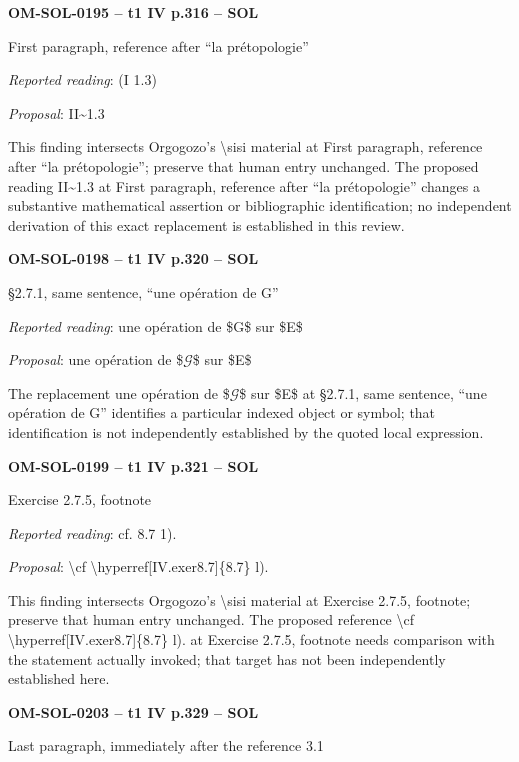 \par\noindent\textbf{OM-SOL-0195 -- t1 IV p.316 -- SOL}\par
First paragraph, reference after “la prétopologie”\par
\emph{Reported reading}: (I 1.3)\par
\emph{Proposal}: II\textasciitilde{}1.3\par
This finding intersects Orgogozo's \textbackslash{}sisi material at First paragraph, reference after “la prétopologie”; preserve that human entry unchanged. The proposed reading II\textasciitilde{}1.3 at First paragraph, reference after “la prétopologie” changes a substantive mathematical assertion or bibliographic identification; no independent derivation of this exact replacement is established in this review.\par
\par\noindent\textbf{OM-SOL-0198 -- t1 IV p.320 -- SOL}\par
§2.7.1, same sentence, “une opération de G”\par
\emph{Reported reading}: une opération de \$G\$ sur \$E\$\par
\emph{Proposal}: une opération de \$\ensuremath{𝒢}\$ sur \$E\$\par
The replacement une opération de \$\ensuremath{𝒢}\$ sur \$E\$ at §2.7.1, same sentence, “une opération de G” identifies a particular indexed object or symbol; that identification is not independently established by the quoted local expression.\par
\par\noindent\textbf{OM-SOL-0199 -- t1 IV p.321 -- SOL}\par
Exercise 2.7.5, footnote\par
\emph{Reported reading}: cf. 8.7 1).\par
\emph{Proposal}: \textbackslash{}cf \textbackslash{}hyperref[IV.exer8.7]\{8.7\} l).\par
This finding intersects Orgogozo's \textbackslash{}sisi material at Exercise 2.7.5, footnote; preserve that human entry unchanged. The proposed reference \textbackslash{}cf \textbackslash{}hyperref[IV.exer8.7]\{8.7\} l). at Exercise 2.7.5, footnote needs comparison with the statement actually invoked; that target has not been independently established here.\par
\par\noindent\textbf{OM-SOL-0203 -- t1 IV p.329 -- SOL}\par
Last paragraph, immediately after the reference 3.1\par

